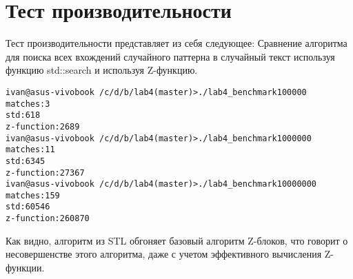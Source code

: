 \section{Тест производительности}

Тест производительности представляет из себя следующее: 
Сравнение алгоритма для поиска всех вхождений случайного паттерна в случайный текст используя
функцию std::search и используя Z-функцию.

\begin{alltt}
ivan@asus-vivobook ~/c/d/b/lab4 (master)> ./lab4_benchmark 100000
matches: 3
std: 618
z-function: 2689
ivan@asus-vivobook ~/c/d/b/lab4 (master)> ./lab4_benchmark 1000000
matches: 11
std: 6345
z-function: 27367
ivan@asus-vivobook ~/c/d/b/lab4 (master)> ./lab4_benchmark 10000000
matches: 159
std: 60546
z-function: 260870
\end{alltt}

Как видно, алгоритм из STL обгоняет базовый алгоритм Z-блоков, что говорит о несовершенстве этого алгоритма, даже
с учетом эффективного вычисления Z-функции.

\pagebreak
